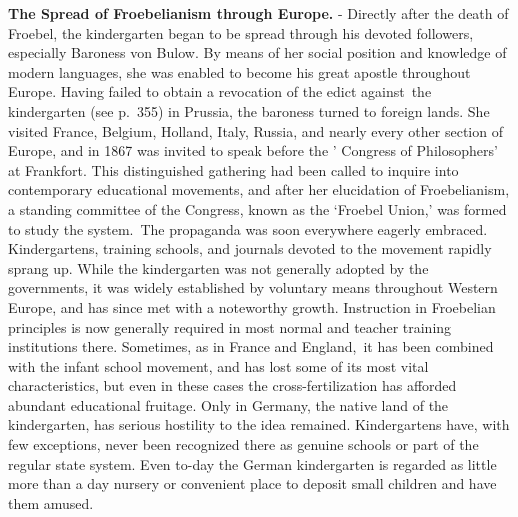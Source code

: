 \documentclass[
]{book}
\begin{document}
\textbf{The Spread of Froebelianism through Europe.} - Directly after the death of Froebel, the kindergarten began to be spread through his devoted followers, especially Baroness von Bulow. By means of her social position and knowledge of modern languages, she was enabled to become his great apostle throughout Europe. Having failed to obtain a revocation of the edict against~the kindergarten (see p.~355) in Prussia, the baroness turned to foreign lands. She visited France, Belgium, Holland, Italy, Russia, and nearly every other section of Europe, and in 1867 was invited to speak before the ' Congress of Philosophers' at Frankfort. This distinguished gathering had been called to inquire into contemporary educational movements, and after her elucidation of Froebelianism, a standing committee of the Congress, known as the `Froebel Union,' was formed to study the system.~The propaganda was soon everywhere eagerly embraced. Kindergartens, training schools, and journals devoted to the movement rapidly sprang up. While the kindergarten was not generally adopted by the governments, it was widely established by voluntary means throughout Western Europe, and has since met with a noteworthy growth. Instruction in Froebelian principles is now generally required in most normal and teacher training institutions there. Sometimes, as in France and England,~it has been combined with the infant school movement, and has lost some of its most vital characteristics, but even in these cases the cross-fertilization has afforded abundant educational fruitage. Only in Germany, the native land of the kindergarten, has serious hostility to the idea remained. Kindergartens have, with few exceptions, never been recognized there as genuine schools or part of the regular state system. Even to-day the German kindergarten is regarded as little more than a day nursery or convenient place to deposit small children and have them amused.
\end{document}
